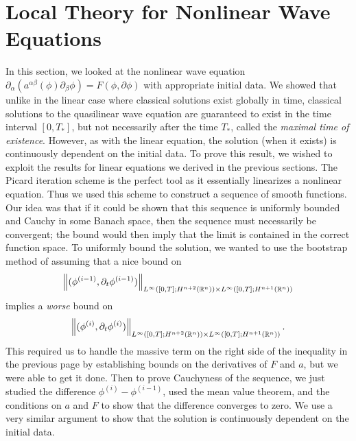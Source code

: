 \documentclass{article}
\begin{document}
	\section{Local Theory for Nonlinear Wave Equations} 
	In this section, we looked at the nonlinear wave equation $\partial_{\alpha}(a^{\alpha\beta}(\phi)\partial_{\beta}\phi)= F(\phi, \partial \phi)$ with appropriate initial data. We showed that unlike in the linear case where classical solutions exist globally in time, classical solutions to the quasilinear wave equation are guaranteed to exist in the time interval $[0,T_{\ast}]$, but not necessarily after the time $T_{\ast}$, called the \textit{maximal time of existence}. However, as with the linear equation, the solution (when it exists) is continuously dependent on the initial data. To prove this result, we wished to exploit the results for linear equations we derived in the previous sections. The Picard iteration scheme is the perfect tool as it essentially linearizes a nonlinear equation. Thus we used this scheme to construct a sequence of smooth functions. Our idea was that if it could be shown that this sequence is uniformly bounded and Cauchy in some Banach space, then the sequence must necessarily be convergent; the bound would then imply that the limit is contained in the correct function space. To uniformly bound the solution, we wanted to use the bootstrap method of assuming that a nice bound on $$\left\Vert (\phi^{(i - 1)}, \partial_{t}\phi^{(i-1)}) \right\Vert_{L^{\infty}([0,T];H^{n + 2}(\mathbb{R}^{n}))\times L^{\infty}([0,T];H^{n + 1}(\mathbb{R}^{n}))}$$ implies a \textit{worse} bound on $$\left\Vert (\phi^{(i)}, \partial_{t}\phi^{(i)}) \right\Vert_{L^{\infty}([0,T];H^{n + 2}(\mathbb{R}^{n}))\times L^{\infty}([0,T];H^{n + 1}(\mathbb{R}^{n}))}.$$ 
	This required us to handle the massive term on the right side of the inequality in the previous page by establishing bounds on the derivatives of $F$ and $a$, but we were able to get it done. Then to prove Cauchyness of the sequence, we just studied the difference $\phi^{(i)} - \phi^{(i - 1)}$, used the mean value theorem, and the conditions on $a$ and $F$ to show that the difference converges to zero. We use a very similar argument to show that the solution is continuously dependent on the initial data. 
	
\end{document}
